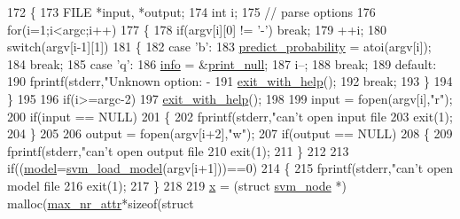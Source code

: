 \begin{DoxyCode}
172 \{
173     FILE *input, *output;
174     \textcolor{keywordtype}{int} i;
175     \textcolor{comment}{// parse options}
176     \textcolor{keywordflow}{for}(i=1;i<argc;i++)
177     \{
178         \textcolor{keywordflow}{if}(argv[i][0] != \textcolor{charliteral}{'-'}) \textcolor{keywordflow}{break};
179         ++i;
180         \textcolor{keywordflow}{switch}(argv[i-1][1])
181         \{
182             \textcolor{keywordflow}{case} \textcolor{charliteral}{'b'}:
183                 \hyperlink{svm-predict_8c_a1501132f5226b295e5300d74da55a2b9}{predict\_probability} = atoi(argv[i]);
184                 \textcolor{keywordflow}{break};
185             \textcolor{keywordflow}{case} \textcolor{charliteral}{'q'}:
186                 \hyperlink{svm-predict_8c_ab42d5f876cd10cdae152b4acbf2e7b8b}{info} = &\hyperlink{svm-predict_8c_afbcd2ef701a510cd6c24fb0463ec6d7c}{print\_null};
187                 i--;
188                 \textcolor{keywordflow}{break};
189             \textcolor{keywordflow}{default}:
190                 fprintf(stderr,\textcolor{stringliteral}{"Unknown option: -%
191                 \hyperlink{svm-predict_8c_a8bbbfc2cd5ea26b69d3b880c6f509e93}{exit\_with\_help}();
192                 \textcolor{keywordflow}{break};
193         \}
194     \}
195 
196     \textcolor{keywordflow}{if}(i>=argc-2)
197         \hyperlink{svm-predict_8c_a8bbbfc2cd5ea26b69d3b880c6f509e93}{exit\_with\_help}();
198 
199     input = fopen(argv[i],\textcolor{stringliteral}{"r"});
200     \textcolor{keywordflow}{if}(input == NULL)
201     \{
202         fprintf(stderr,\textcolor{stringliteral}{"can't open input file %
203         exit(1);
204     \}
205 
206     output = fopen(argv[i+2],\textcolor{stringliteral}{"w"});
207     \textcolor{keywordflow}{if}(output == NULL)
208     \{
209         fprintf(stderr,\textcolor{stringliteral}{"can't open output file %
210         exit(1);
211     \}
212 
213     \textcolor{keywordflow}{if}((\hyperlink{svm-predict_8c_a50c87b127b14787341e9630f4f5c700a}{model}=\hyperlink{svm_8h_a569bb1a06e5181dfb19d66587463af4b}{svm\_load\_model}(argv[i+1]))==0)
214     \{
215         fprintf(stderr,\textcolor{stringliteral}{"can't open model file %
216         exit(1);
217     \}
218 
219     \hyperlink{svm-predict_8c_a9a5b72a4065074cac5da07efb80a1e79}{x} = (\textcolor{keyword}{struct }\hyperlink{structsvm__node}{svm\_node} *) malloc(\hyperlink{svm-predict_8c_af95bde9162db2c5dd97e80795b3548ed}{max\_nr\_attr}*\textcolor{keyword}{sizeof}(\textcolor{keyword}{struct} 
}}}}
\end{DoxyCode}
